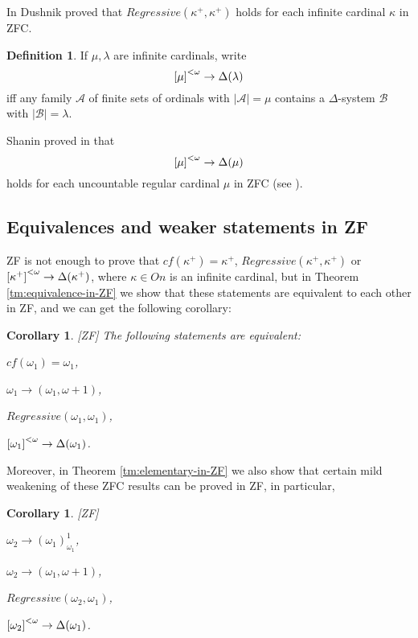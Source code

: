 \documentclass[a4paper,10pt,reqno]{amsart}
\numberwithin{equation}{section}
\newtheorem{corollary}[theorem]{Corollary}
\theoremstyle{definition}
\newtheorem{definition}[theorem]{Definition}
\theoremstyle{remark}
\newcommand{\mc}[1]{\mathcal{#1}}
\begin{document}
In \cite{Du31-reg} Dushnik proved that $Regressive({\kappa}^+,{\kappa}^+)$ holds for each infinite cardinal ${\kappa}$
in ZFC.   


\begin{definition}
If ${\mu},{\lambda}$ are infinite cardinals, write
$${[{\mu}]}^{<{\omega}}\to \Delta({\lambda})$$
iff any family $\mc A$ of finite sets of ordinals with $|\mc A|={\mu}$ contains
a $\Delta$-system $\mc B$ with $|\mc B|={\lambda}$.
\end{definition}

Shanin proved in \cite{Sa46} that 
 $${[{\mu}]}^{<{\omega}}\to \Delta(\mu)$$ holds for each uncountable  regular cardinal 
${\mu}$ in ZFC (see \cite[Theorem 9.18]{Je82}). 


\subsection*{Equivalences and weaker statements in ZF}       


ZF is not enough to prove that $cf({\kappa}^+)={\kappa}^+$, $Regressive({\kappa}^+,{\kappa}^+)$
or ${[{\kappa}^+]}^{<{\omega}}\to \Delta({\kappa}^+)$, where ${\kappa}\in On $ is an infinite cardinal,
but in Theorem \ref{tm:equivalence-in-ZF} we show that these statements are equivalent to each other 
in ZF, and we can get the following corollary:


\begin{corollary}\label{cr:eq}[ZF]
The following statements are equivalent:
\begin{inparaenum}
    \item $cf({\omega}_1)={\omega}_1$, 
    \item ${\omega}_1\to ({\omega}_1,{\omega}+1)$,
    \item $Regressive({\omega}_1,{\omega}_1)$,
    \item ${[{\omega}_1]}^{<{\omega}}\to \Delta({\omega}_1)$.
    \end{inparaenum}
\end{corollary}

Moreover, in Theorem \ref{tm:elementary-in-ZF} we also show that certain mild weakening 
of these ZFC results can be proved in ZF, in particular,  
\begin{corollary}\label{crweak-:true}[ZF]
    \begin{inparaenum}
        \item ${\omega}_2\to ({\omega}_1)^1_{{\omega}_1}$, 
        \item ${\omega}_2\to ({\omega}_1,{\omega}+1)$,
        \item $Regressive({\omega}_2,{\omega}_1)$,
        \item ${[{\omega}_2]}^{<{\omega}}\to \Delta({\omega}_1)$.
        \end{inparaenum}
    
    \end{corollary}
    
\end{document}
